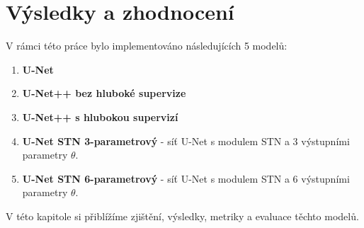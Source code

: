 \chapter{Výsledky a zhodnocení}
\label{sec:Chapter6}
V rámci této práce bylo implementováno následujících 5 modelů:
\begin{enumerate}
    \item \textbf{U-Net}
    \item \textbf{U-Net++ bez hluboké supervize} 
    \item \textbf{U-Net++ s hlubokou supervizí}
    \item \textbf{U-Net STN 3-parametrový} - síť U-Net s modulem STN a 3 výstupními parametry $\theta$.
    \item \textbf{U-Net STN 6-parametrový} - síť U-Net s modulem STN a 6 výstupními parametry $\theta$.
\end{enumerate}
V této kapitole si přiblížíme zjištění, výsledky, metriky a evaluace těchto modelů.

\endinput